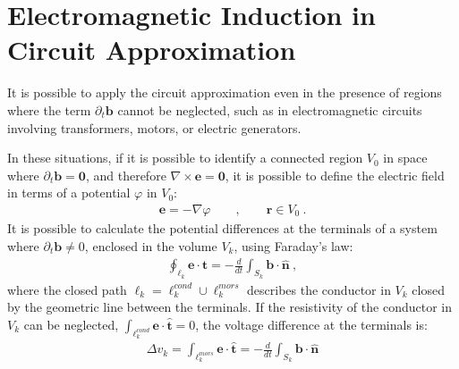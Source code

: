 \documentclass[letterpaper,10pt,english]{jupyterBook}
\begin{document}
\sphinxstepscope


\section{Electromagnetic Induction in Circuit Approximation}
\label{\detokenize{ch/circuits-electric-induction:electromagnetic-induction-in-circuit-approximation}}\label{\detokenize{ch/circuits-electric-induction:classical-electromagnetism-circuits-electric-induction}}\label{\detokenize{ch/circuits-electric-induction::doc}}
\sphinxAtStartPar
It is possible to apply the circuit approximation even in the presence of regions where the term \(\partial_t \mathbf{b}\) cannot be neglected, such as in electromagnetic circuits involving transformers, motors, or electric generators.

\sphinxAtStartPar
In these situations, if it is possible to identify a connected region \(V_0\) in space where \(\partial_t \mathbf{b} = \mathbf{0}\), and therefore \(\nabla \times \mathbf{e} = \mathbf{0}\), it is possible to define the electric field in terms of a potential \(\varphi\) in \(V_0\):
\begin{equation*}
\begin{split}\mathbf{e} = - \nabla \varphi \qquad , \qquad \mathbf{r} \in V_0 \ .\end{split}
\end{equation*}
\sphinxAtStartPar
It is possible to calculate the potential differences at the terminals of a system where \(\partial_t \mathbf{b} \ne 0\), enclosed in the volume \(V_k\), using Faraday’s law:
\begin{equation*}
\begin{split}\oint_{\ell_k} \mathbf{e} \cdot \hat{\mathbf{t}} = - \frac{d}{dt} \int_{S_k} \mathbf{b} \cdot \hat{\mathbf{n}} \ ,\end{split}
\end{equation*}
\sphinxAtStartPar
where the closed path \(\ell_k = \ell_k^{cond} \cup \ell_k^{mors}\) describes the conductor in \(V_k\) closed by the geometric line between the terminals. If the resistivity of the conductor in \(V_k\) can be neglected, \(\int_{\ell_k^{cond}} \mathbf{e} \cdot \hat{\mathbf{t}} = 0\), the voltage difference at the terminals is:
\begin{equation*}
\begin{split}\Delta v_k = \int_{\ell^{mors}_k} \mathbf{e} \cdot \hat{\mathbf{t}} = - \frac{d}{dt} \int_{S_k} \mathbf{b} \cdot \hat{\mathbf{n}}\end{split}
\end{equation*}
\sphinxstepscope
\end{document}
